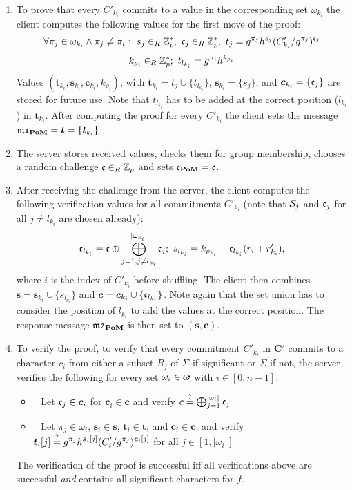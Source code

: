 \begin{enumerate}
  \item To prove that every $C'_{{k_i}}$ commits to a value in the corresponding set $\omega_{{k_i}}$ the client computes the following values for the first move of the proof:
    \[
      \forall \pi_j\in\omega_{{k_i}} \wedge \pi_j\not=\pi_i :~ s_j\in_R\mathbb{Z}^\ast_p,~ \mathfrak{c}_j\in_R\mathbb{Z}^\ast_p,~ t_j=g^{\pi_j}h^{s_j}(C'_{{k_i}}/g^{\pi_j})^{\mathfrak{c}_j}
    \]
    \[
      k_{\rho_i}\in_R\mathbb{Z}^\ast_p;~ t_{l_{k_i}}=g^{\pi_i}h^{k_{\rho_i}}
    \]
    Values $(\bm t_{k_i}, \bm s_{k_i}, \bm c_{k_i}, k_{\rho_i})$, with $\bm t_{k_i}= t_j \cup \{t_{l_{k_i}}\}$, $\bm s_{k_i}=\{s_j\}$, and $\bm c_{k_i}=\{\mathfrak{c}_j\}$ are stored for future use.
    Note that $t_{l_{k_i}}$ has to be added at the correct position ($l_{k_i}$) in $\bm t_{k_i}$.
    After computing the proof for every $C'_{k_i}$ the client sets the message $\mathfrak{m1}_\mathsf{\bf PoM}=\bm t = \{\bm t_{k_i}\}$.
    
  \item The server stores received values, checks them for group membership, chooses a random challenge $\mathfrak{c}\in_R\mathbb{Z}_p$ and sets $\mathfrak{c}_\mathsf{\bf PoM}=\mathfrak{c}$.
  
  \item After receiving the challenge \Ch from the server, the client computes the following verification values for all commitments $C'_{{k_i}}$ (note that $\mathcal{S}_j$ and $\mathfrak{c}_j$ for all $j\not= l_{k_i}$ are chosen already):
    \[
      \mathfrak{c}_{l_{k_i}}=\mathfrak{c}\oplus \bigoplus_{j=1,j\not=l_{k_i}}^{|\omega_{k_i}|} \mathfrak{c}_j;~ s_{l_{k_i}}=k_{\rho_{k_i}} - \mathfrak{c}_{l_{k_i}}(r_{i}+r'_{k_i}),
    \]
    where $i$ is the index of $C'_{k_i}$ before shuffling.
    The client then combines $\bm s = \bm s_{k_i} \cup \{s_{l_{k_i}}\}$ and $\bm c = \bm c_{k_i} \cup \{\mathfrak{c}_{l_{k_i}}\}$.
    Note again that the set union has to consider the position of $l_{k_i}$ to add the values at the correct position.
    The response message $\mathfrak{m2}_\mathsf{\bf PoM}$ is then set to $(\bm s, \bm c)$.
  
  \item To verify the proof, \ie to verify that every commitment $C'_{k_i}$ in $\bm C'$ commits to a character $c_i$ from either a subset $R_j$ of $\Sigma$ if significant or $\Sigma$ if not, the server verifies the following for every set $\omega_{i} \in \boldsymbol{\mathbf{\omega}}$ with $i\in[0,n-1]$:
    \begin{itemize}
      \item~ Let $\mathfrak{c}_j\in\bm c_i$ for $\bm c_i\in\bm c$ and verify
            $c\stackrel{?}{=} \bigoplus_{j=1}^{|\omega_i|}\mathfrak{c}_j$
      \item~ Let $\pi_j\in\omega_{i}$, $\bm s_i \in \bm s$, $\bm t_i\in \bm t$, and $\bm c_i \in \bm c$, and verify
            $\displaystyle \bm t_{i}[j]\stackrel{?}{=} g^{\pi_j}h^{\bm s_i[j]}(C'_i/g^{\pi_j})^{\bm c_i[j]}$
            for all $j\in[1,|\omega_{i}|]$
    \end{itemize}
    The verification of the proof is successful iff all verifications above are successful \emph{and} \vect{\omega} contains all significant characters for $f$.
\end{enumerate}

